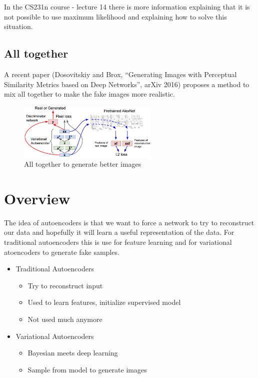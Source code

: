 In the CS231n course - lecture 14 there is more information explaining that it is not possible to use maximum likelihood and explaining how to solve this situation.

\subsection*{All together}
A recent paper (Dosovitskiy and Brox, “Generating Images with Perceptual Similarity Metrics based on Deep Networks”, arXiv 2016) proposes a method to mix all together to make the fake images more realistic.
\begin{figure}[!htb]
  \centering
  \includegraphics[width=0.6\textwidth]{Images/autoencoders/11.png}
  \caption{All together to generate better images}
\end{figure}

\section*{Overview}
The idea of autoencoders is that we want to force a network to try to reconstruct our data and hopefully it will learn a useful representation of the data. For traditional autoencoders this is use for feature learning and for variational atoencoders to generate fake samples.

\begin{itemize}
\item Traditional Autoencoders
\begin{itemize}
\item Try to reconstruct input
\item Used to learn features, initialize supervised model
\item Not used much anymore
\end{itemize}
\item Variational Autoencoders
\begin{itemize}
\item Bayesian meets deep learning
\item Sample from model to generate images
\end{itemize}
\end{itemize}
